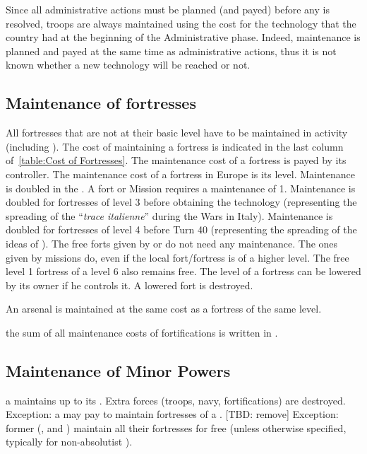 \begin{designnote}
  Since all administrative actions must be planned (and payed) before any is
  resolved, troops are always maintained using the cost for the technology
  that the country had at the beginning of the Administrative phase. Indeed,
  maintenance is planned and payed at the same time as administrative actions,
  thus it is not known whether a new technology will be reached or not.
\end{designnote}



\subsection{Maintenance of fortresses}

\aparag All fortresses that are not at their basic level have to be maintained
in activity (including \Presidios). The cost of maintaining a fortress is
indicated in the last column of~\ref{table:Cost of Fortresses}.
\bparag The maintenance cost of a fortress is payed by its controller.
\bparag The maintenance cost of a fortress in Europe is its level.
\bparag Maintenance is doubled in the \ROTW. A fort or Mission requires a
maintenance of 1\ducats.
\bparag Maintenance is doubled for fortresses of level 3 before obtaining the
technology \TARQ (representing the spreading of the ``\emph{trace italienne}''
during the Wars in Italy).
\bparag Maintenance is doubled for fortresses of level 4 before Turn 40
(representing the spreading of the ideas of ).
\bparag The free forts given by \TP or \COL do not need any maintenance. The
ones given by missions do, even if the local fort/fortress is of a higher
level. The free level 1 fortress of a level 6 \COL also remains free.
\bparag The level of a fortress can be lowered by its owner if he controls
it. A lowered fort is destroyed.

\aparag[Arsenals] An arsenal is maintained at the same cost as a fortress of
the same level.

\aparag the sum of all maintenance costs of fortifications is written in
.




\subsection{Maintenance of Minor Powers}
\label{chLogistic:Maintenance of minors}
\aparag[At peace] a \MIN maintains up to its . Extra
forces (troops, navy, fortifications) are destroyed.
\bparag Exception: a \MAJ may pay to maintain fortresses of a \VASSAL. [TBD:
remove]
\bparag Exception: former \MAJ (\paysPortugal, \paysVenise and \paysPologne)
maintain all their fortresses for free (unless otherwise specified, typically
for non-absolutist \paysPologne).

